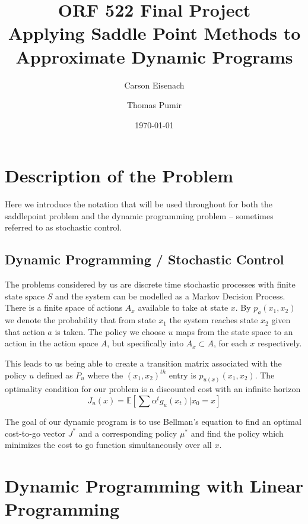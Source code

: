 \documentclass[12pt,reqno]{amsart}
\newcommand{\E}{\mathbb{E}}
\numberwithin{equation}{section}
\begin{document}
\title{ORF 522 Final Project \\ Applying Saddle Point Methods to Approximate Dynamic Programs}

\author{Carson Eisenach}
\author{Thomas Pumir}

\date{\today}

\maketitle

\section{Description of the Problem}

Here we introduce the notation that will be used throughout for both the saddlepoint problem and the dynamic programming problem -- sometimes referred to as stochastic control.

\subsection{Dynamic Programming / Stochastic Control}
The problems considered by us are discrete time stochastic processes with finite state space $S$ and the system can be modelled as a Markov Decision Process. There is a finite space of actions $A_x$ available to take at state $x$. By $p_a(x_1,x_2)$ we denote the probability that from state $x_1$ the system reaches state $x_2$ given that action $a$ is taken. The policy we choose $u$ maps from the state space to an action in the action space $A$, but specifically into $A_x \subset A$, for each $x$ respectively.

This leads to us being able to create a transition matrix associated with the policy $u$ defined as $P_u$ where the $(x_1,x_2)^{th}$ entry is $p_{u(x)}(x_1,x_2)$. The optimality condition for our problem is a discounted cost with an infinite horizon
$$
J_u(x) = \E [\sum \alpha^t g_u(x_t) | x_0 = x]
$$

The goal of our dynamic program is to use Bellman's equation to find an optimal cost-to-go vector $J^*$ and a corresponding policy $\mu^*$ and find the policy which minimizes the cost to go function simultaneously over all $x$.

\section{Dynamic Programming with Linear Programming}
\end{document}
